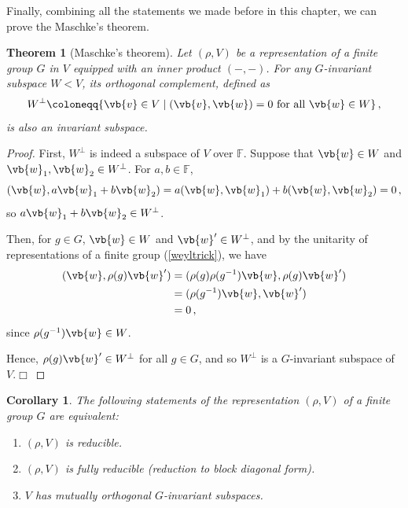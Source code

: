 \documentclass{article}
\theoremstyle{plain}\theoremheaderfont{\normalfont\itshape}\theorembodyfont{\rmfamily}\theoremseparator{.}\newtheorem*{rem}{Remark}\newtheorem*{ex}{Example}\newtheorem*{proof}{Proof}\newtheorem*{altp}{Alternative proof}
\theoremstyle{plain}\theoremheaderfont{\normalfont\bfseries}\theorembodyfont{\rmfamily}\theoremseparator{.}\newtheorem{thm}{Theorem}[section]\newtheorem{lem}[thm]{Lemma}\newtheorem{prop}[thm]{Proposition}\newtheorem*{cor}{Corollary}\newtheorem{defn}[thm]{Definition}\newtheorem{clm}[thm]{Claim}\newtheorem{clminproof}{Claim}
\theoremstyle{break}\theoremheaderfont{\normalfont\itshape}\theorembodyfont{\rmfamily}\theoremseparator{.\medskip}\newtheorem*{proofskip}{Proof}\newtheorem*{exs}{Examples}\newtheorem*{rems}{Remarks}
\theoremstyle{break}\theoremheaderfont{\normalfont\bfseries}\theorembodyfont{\rmfamily}\theoremseparator{.\medskip}\newtheorem{lemskip}[thm]{Lemma}\newtheorem{defnskip}[thm]{Definition}\newtheorem{propskip}[thm]{Proposition}\newtheorem{thmskip}[thm]{Theorem}
\numberwithin{equation}{section}
\newcommand{\qed}{\hfill\ensuremath{\Box}}
\begin{document}
	Finally, combining all the statements we made before in this chapter, we can prove the Maschke's theorem.
	\begin{thm}[Maschke's theorem]
		Let \((\rho,V)\) be a representation of a finite group \(G\) in \(V\) equipped with an inner product \((-,-)\). For any \(G\)-invariant subspace \(W<V\), its \textit{orthogonal complement}, defined as
		\[W^\perp \coloneqq\{\vb{v}\in V\mid (\vb{v},\vb{w})=0\text{ for all }\vb{w}\in W\}\,,\]
		is also an invariant subspace.
	\end{thm}
	\begin{proof}
		First, \(W^\perp\) is indeed a subspace of \(V\) over \(\mathbb{F}\). Suppose that \(\vb{w}\in W\) and \(\vb{w}_1,\vb{w}_2\in W^\perp\). For \(a,b\in\mathbb{F}\),
		\[(\vb{w},a\vb{w}_1+b\vb{w}_2)=a(\vb{w},\vb{w}_1)+b(\vb{w},\vb{w}_2)=0\,,\]
		so \(a\vb{w}_1+b\vb{w}_2\in W^\perp\).

		Then, for \(g\in G\), \(\vb{w}\in W\) and \(\vb{w}'\in W^\perp\),	and by the unitarity of representations of a finite group (\cref{weyltrick}), we have
		\begin{align*}
			(\vb{w},\rho(g)\vb{w}')&=(\rho(g)\rho(g^{-1})\vb{w},\rho(g)\vb{w}')\\
			&=(\rho(g^{-1})\vb{w},\vb{w}')\\
			&=0\,,
		\end{align*}
		since \(\rho(g^{-1})\vb{w}\in W\).

		Hence, \(\rho(g)\vb{w}'\in W^\perp\) for all \(g\in G\), and so \(W^\perp\) is a \(G\)-invariant subspace of \(V\).\qed
	\end{proof}
	\begin{cor}
		The following statements of the representation \((\rho,V)\) of a finite group \(G\) are equivalent:
		\begin{enumerate}[topsep=0pt]
			\item[(i)] \((\rho,V)\) is reducible.
			\item[(ii)] \((\rho,V)\) is fully reducible (reduction to block diagonal form).
			\item[(iii)] \(V\) has mutually orthogonal \(G\)-invariant subspaces.
		\end{enumerate}
	\end{cor}
\end{document}
